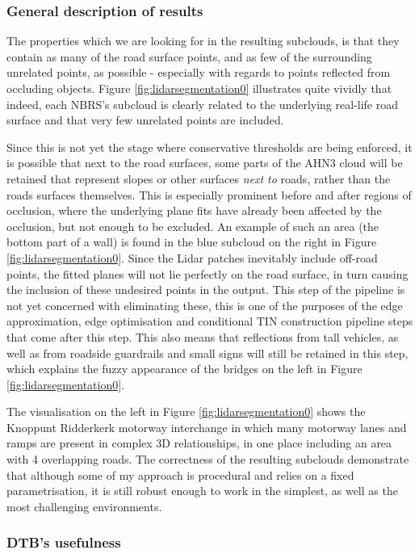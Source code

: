 \subsubsection{General description of results}

The properties which we are looking for in the resulting subclouds, is that they contain as many of the road surface points, and as few of the surrounding unrelated points, as possible - especially with regards to points reflected from occluding objects. Figure \ref{fig:lidarsegmentation0} illustrates quite vividly that indeed, each NBRS's subcloud is clearly related to the underlying real-life road surface and that very few unrelated points are included.

Since this is not yet the stage where conservative thresholds are being enforced, it is possible that next to the road surfaces, some parts of the AHN3 cloud will be retained that represent slopes or other surfaces \textit{next to} roads, rather than the roads surfaces themselves. This is especially prominent before and after regions of occlusion, where the underlying plane fits have already been affected by the occlusion, but not enough to be excluded. An example of such an area (the bottom part of a wall) is found in the blue subcloud on the right in Figure \ref{fig:lidarsegmentation0}. Since the Lidar patches inevitably include off-road points, the fitted planes will not lie perfectly on the road surface, in turn causing the inclusion of these undesired points in the output. This step of the pipeline is not yet concerned with eliminating these, this is one of the purposes of the edge approximation, edge optimisation and conditional TIN construction pipeline steps that come after this step. This also means that reflections from tall vehicles, as well as from roadside guardrails and small signs will still be retained in this step, which explains the fuzzy appearance of the bridges on the left in Figure \ref{fig:lidarsegmentation0}.

The visualisation on the left in Figure \ref{fig:lidarsegmentation0} shows the Knoppunt Ridderkerk motorway interchange in which many motorway lanes and ramps are present in complex 3D relationships, in one place including an area with 4 overlapping roads. The correctness of the resulting subclouds demonstrate that although some of my approach is procedural and relies on a fixed parametrisation, it is still robust enough to work in the simplest, as well as the most challenging environments.

\subsubsection{DTB's usefulness}

